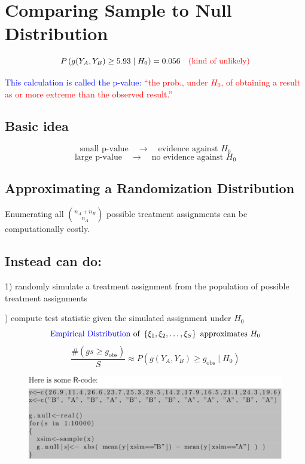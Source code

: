 \documentclass[14pt]{extarticle}
\begin{document}
\section*{Comparing Sample to Null Distribution}
\[
P \left( g(Y_A, Y_B) \geq 5.93 \mid H_0 \right) = 0.056
\quad \textcolor{red}{\text{(kind of unlikely)}}
\]

\textcolor{blue}{This calculation is called the p-value:}
\textcolor{red}{``the prob., under $H_0$, of obtaining a result as or more extreme than the observed result.''}

\subsection*{Basic idea}
\[
\text{small p-value} \quad \rightarrow \quad \text{evidence against } H_0
\]
\[
\text{large p-value} \quad \rightarrow \quad \text{no evidence against } H_0
\]

\subsection*{Approximating a Randomization Distribution}

Enumerating all $\binom{n_A + n_B}{n_A}$ 
possible treatment assignments can be computationally costly.

\subsection*{Instead can do:}

1) randomly simulate a treatment assignment from the population of possible treatment assignments

) compute test statistic given the simulated assignment under \(H_0\)
\[
\textcolor{blue}{\text{Empirical Distribution}} \text{ of } \left\{ \xi_1, \xi_2, \dots, \xi_S \right\} \text{ approximates } H_0
\]
\[
\frac{\#(gs \geq g_{\text{obs}})}{S} \approx P \left( g(Y_A, Y_B) \geq g_{\text{obs}} \mid H_0 \right)
\]
\begin{figure}[H]
    \centering
    \includegraphics[width=1\textwidth]{fig2.png}
\end{figure}
\end{document}
